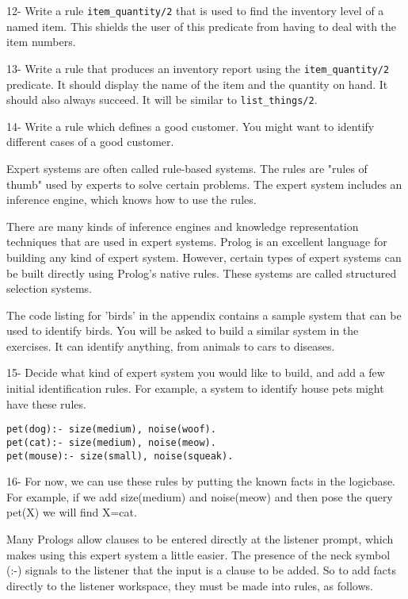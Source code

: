 
12- Write a rule \verb'item_quantity/2' that is used to find the inventory level
of a named item. This shields the user of this predicate from having to deal
with the item numbers.

13- Write a rule that produces an inventory report using the
\verb'item_quantity/2' predicate. It should display the name of the item and the
quantity on hand. It should also always succeed. It will be similar to
\verb'list_things/2'.

14- Write a rule which defines a good customer. You might want to identify
different cases of a good customer.


Expert systems are often called rule-based systems. The rules are "rules of
thumb" used by experts to solve certain problems. The expert system includes an
inference engine, which knows how to use the rules.

There are many kinds of inference engines and knowledge representation
techniques that are used in expert systems. Prolog is an excellent language for
building any kind of expert system. However, certain types of expert systems can
be built directly using Prolog's native rules. These systems are called
structured selection systems.

The code listing for 'birds' in the appendix contains a sample system that can
be used to identify birds. You will be asked to build a similar system in the
exercises. It can identify anything, from animals to cars to diseases.

15- Decide what kind of expert system you would like to build, and add a few
initial identification rules. For example, a system to identify house pets might
have these rules.

\begin{verbatim}
pet(dog):- size(medium), noise(woof).
pet(cat):- size(medium), noise(meow).
pet(mouse):- size(small), noise(squeak).
\end{verbatim}

16- For now, we can use these rules by putting the known facts in the logicbase.
For example, if we add size(medium) and noise(meow) and then pose the query
pet(X) we will find X=cat.

Many Prologs allow clauses to be entered directly at the listener prompt, which
makes using this expert system a little easier. The presence of the neck symbol
(:-) signals to the listener that the input is a clause to be added. So to add
facts directly to the listener workspace, they must be made into rules, as
follows.

